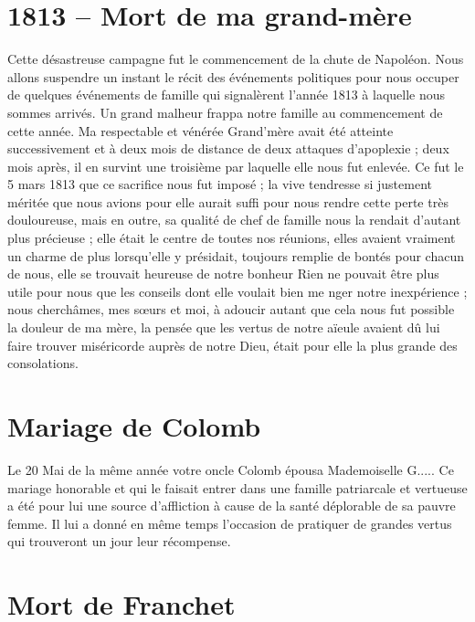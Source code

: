 \documentclass[11pt,a4paper]{report}
\begin{document}
\section*{1813 -- Mort de ma grand-mère}

Cette désastreuse campagne fut le commencement de la chute de Napoléon. Nous allons suspendre un instant le récit des événements politiques pour nous occuper de quelques événements de famille qui signalèrent l'année 1813 à laquelle nous sommes arrivés. Un grand malheur frappa notre famille au commencement de cette année. Ma respectable et vénérée Grand'mère avait été atteinte successivement et à deux mois de distance de deux attaques d'apoplexie ; deux mois après, il en survint une troisième par laquelle elle nous fut enlevée. Ce fut le 5 mars 1813 que ce sacrifice nous fut imposé ; la vive tendresse si justement méritée que nous avions pour elle aurait suffi pour nous rendre cette perte très douloureuse, mais en outre, sa qualité de chef de famille nous la rendait d'autant plus précieuse ; elle était le centre de toutes nos réunions, elles avaient vraiment un charme de plus lorsqu'elle y présidait, toujours remplie de bontés pour chacun de nous, elle se trouvait heureuse de notre bonheur Rien ne pouvait être plus utile pour nous que les conseils dont elle voulait bien me nger notre inexpérience ; nous cherchâmes, mes sœurs et moi, à adoucir autant que cela nous fut possible la douleur de ma mère, la pensée que les vertus de notre aïeule avaient dû lui faire trouver miséricorde auprès de notre Dieu, était pour elle la plus grande des consolations.

\section*{Mariage de Colomb}

Le 20 Mai de la même année votre oncle Colomb épousa Mademoiselle G..... Ce mariage honorable et qui le faisait entrer dans une famille patriarcale et vertueuse a été pour lui une source d'affliction à cause de la santé déplorable de sa pauvre femme. Il lui a donné en même temps l'occasion de pratiquer de grandes vertus qui trouveront un jour leur récompense.

\section*{Mort de Franchet}
\end{document}
